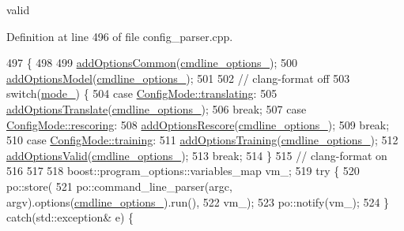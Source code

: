 valid 

Definition at line 496 of file config\+\_\+parser.\+cpp.


\begin{DoxyCode}
497                                             \{
498 
499   \hyperlink{classmarian_1_1ConfigParser_ae77d0dbd400ca620dbf5b053278f4141}{addOptionsCommon}(\hyperlink{classmarian_1_1ConfigParser_af57fa6f4fb82e1e5b6068e7dcb56b3b2}{cmdline\_options\_});
500   \hyperlink{classmarian_1_1ConfigParser_aa2556e888231001b9f4d02cd742939ba}{addOptionsModel}(\hyperlink{classmarian_1_1ConfigParser_af57fa6f4fb82e1e5b6068e7dcb56b3b2}{cmdline\_options\_});
501 
502   \textcolor{comment}{// clang-format off}
503   \textcolor{keywordflow}{switch}(\hyperlink{classmarian_1_1ConfigParser_ae3bb2ffc2601222cc53734a60ab1f980}{mode\_}) \{
504     \textcolor{keywordflow}{case} \hyperlink{namespacemarian_aaddd4b008ff5352b1fe7e16574f7e1f9a5143d2bebfe7a6b9c7050a8f6bf53e2b}{ConfigMode::translating}:
505       \hyperlink{classmarian_1_1ConfigParser_a07165d2c1c885c858d8127eb09f00e71}{addOptionsTranslate}(\hyperlink{classmarian_1_1ConfigParser_af57fa6f4fb82e1e5b6068e7dcb56b3b2}{cmdline\_options\_});
506       \textcolor{keywordflow}{break};
507     \textcolor{keywordflow}{case} \hyperlink{namespacemarian_aaddd4b008ff5352b1fe7e16574f7e1f9a6911beb2d5fc11863fef8f5daee5a184}{ConfigMode::rescoring}:
508       \hyperlink{classmarian_1_1ConfigParser_aedbe49f4f858e12c403268b365b46865}{addOptionsRescore}(\hyperlink{classmarian_1_1ConfigParser_af57fa6f4fb82e1e5b6068e7dcb56b3b2}{cmdline\_options\_});
509       \textcolor{keywordflow}{break};
510     \textcolor{keywordflow}{case} \hyperlink{namespacemarian_aaddd4b008ff5352b1fe7e16574f7e1f9ac185ddac8b5a8f5aa23c5b80bc12d214}{ConfigMode::training}:
511       \hyperlink{classmarian_1_1ConfigParser_aed7318279a0412b11ff0a9e23363c12e}{addOptionsTraining}(\hyperlink{classmarian_1_1ConfigParser_af57fa6f4fb82e1e5b6068e7dcb56b3b2}{cmdline\_options\_});
512       \hyperlink{classmarian_1_1ConfigParser_a9d7e94d97f2cc1cc7b6fe7e36e7b1f6d}{addOptionsValid}(\hyperlink{classmarian_1_1ConfigParser_af57fa6f4fb82e1e5b6068e7dcb56b3b2}{cmdline\_options\_});
513       \textcolor{keywordflow}{break};
514   \}
515   \textcolor{comment}{// clang-format on}
516 
517 
518   boost::program\_options::variables\_map vm\_;
519   \textcolor{keywordflow}{try} \{
520     po::store(
521         po::command\_line\_parser(argc, argv).options(\hyperlink{classmarian_1_1ConfigParser_af57fa6f4fb82e1e5b6068e7dcb56b3b2}{cmdline\_options\_}).run(),
522         vm\_);
523     po::notify(vm\_);
524   \} \textcolor{keywordflow}{catch}(std::exception& e) \{

\end{DoxyCode}

